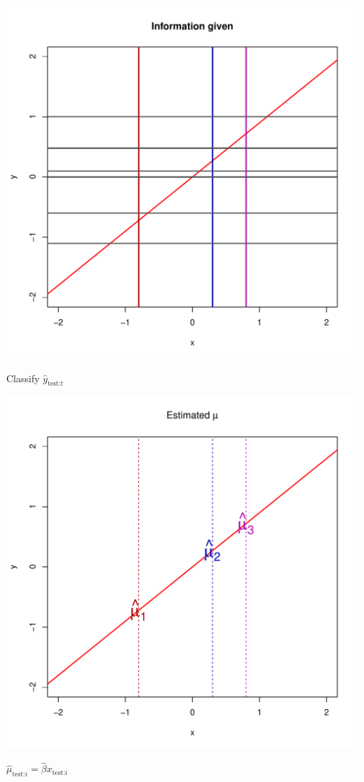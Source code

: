 \documentclass{beamer}
\begin{document}
\begin{frame}
\begin{center}
\includegraphics[scale = 0.4]{ti4.pdf}
\end{center}
Classify $\hat{y}_{\text{test:} t}$
\end{frame}

\begin{frame}
\begin{center}
\includegraphics[scale = 0.4]{ti5.pdf}
\end{center}
$\hat{\mu}_{\text{test:} i} = \hat{\beta} x_{\text{test:} i}$
\end{frame}
\end{document}
